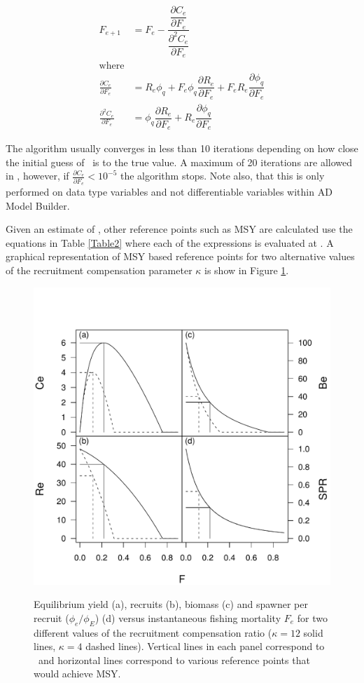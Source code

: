 \begin{align}\label{eq1.1}
    F_{e+1}&=F_e - 
    \dfrac{ \dfrac{\partial C_e}{\partial F_e}}
    { \dfrac{\partial^2 C_e}{\partial F_e}}\\
    \mbox{where}\nonumber\\
     \frac{\partial C_e}{\partial F_e} &=
    R_e \phi_q
    + F_e \phi_q \dfrac{\partial R_e}{\partial F_e}
    + F_e R_e \dfrac{\partial \phi_q}{\partial F_e} \nonumber\\
    \frac{\partial^2 C_e}{\partial F_e} &=
    \phi_q \dfrac{\partial R_e}{\partial F_e}
   +  R_e \dfrac{\partial \phi_q}{\partial F_e}\nonumber
\end{align}

The algorithm usually converges in less than 10 iterations depending on how close the initial guess of \fmsy\ is to the true value.  A maximum of 20 iterations are allowed in \iscam, however, if $\frac{\partial C_e}{\partial F_e}<10^{-5}$ the algorithm stops.  Note also, that this is only performed on data type variables and not differentiable variables within AD Model Builder.

Given an estimate of \fmsy, other reference points such as MSY are calculated use the equations in Table \ref{Table2} where each of the expressions is evaluated at \fmsy.  A graphical representation of MSY based reference points for two alternative values of the recruitment compensation parameter $\kappa$ is show in Figure \ref{FigMSY}.

\begin{figure}[!tbp]
  \centering
  \includegraphics[width=0.5\columnwidth]{Figs/Fig1Quadplot.pdf}\\
  \caption{Equilibrium yield (a), recruits (b), biomass (c) and
spawner per recruit ($\phi_e/\phi_E$) (d) versus instantaneous
fishing mortality $F_e$ for two different values of the recruitment
compensation ratio ($\kappa=12$ solid lines, $\kappa=4$ dashed
lines). Vertical lines in each panel correspond to \fmsy\ and
horizontal lines correspond to various reference points that would
achieve MSY.}\label{FigMSY}
\end{figure}

